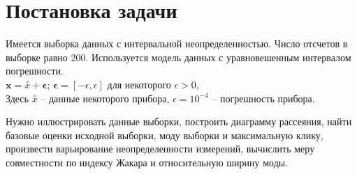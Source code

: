 \section{Постановка задачи}

Имеется выборка данных с интервальной неопределенностью. Число отсчетов в выборке равно 200. Используется модель данных с  уравновешенным интервалом погрешности. \\

$\bm{x} = \stackrel{\circ}{x} + \bm{\epsilon}$; \quad $\bm{\epsilon} = [-\epsilon, \epsilon]$  для некоторого $\epsilon >0 $, \\

Здесь $\stackrel{\circ}{x}$ -- данные некоторого прибора, $\epsilon = 10 ^ {-4}$ -- погрешность прибора.

Нужно иллюстрировать данные выборки, построить диаграмму рассеяния, найти базовые оценки исходной выборки, моду выборки и максимальную клику, произвести варьирование неопределенности измерений, вычислить меру совместности по индексу Жакара и относительную ширину моды.